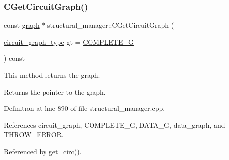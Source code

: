 \subsubsection{\texorpdfstring{C\+Get\+Circuit\+Graph()}{CGetCircuitGraph()}}
{\footnotesize\ttfamily const \hyperlink{structgraph}{graph} $\ast$ structural\+\_\+manager\+::\+C\+Get\+Circuit\+Graph (\begin{DoxyParamCaption}\item[{\hyperlink{classstructural__manager_a3ddbeaa6139edd572bbba57042d0a130}{circuit\+\_\+graph\+\_\+type}}]{gt = {\ttfamily \hyperlink{classstructural__manager_a3ddbeaa6139edd572bbba57042d0a130ae146a36ef45766fd339bb94010337a3a}{C\+O\+M\+P\+L\+E\+T\+E\+\_\+G}} }\end{DoxyParamCaption}) const}



This method returns the graph. 

\begin{DoxyReturn}{Returns}
the pointer to the graph. 
\end{DoxyReturn}


Definition at line 890 of file structural\+\_\+manager.\+cpp.



References circuit\+\_\+graph, C\+O\+M\+P\+L\+E\+T\+E\+\_\+G, D\+A\+T\+A\+\_\+G, data\+\_\+graph, and T\+H\+R\+O\+W\+\_\+\+E\+R\+R\+OR.



Referenced by get\+\_\+circ().

